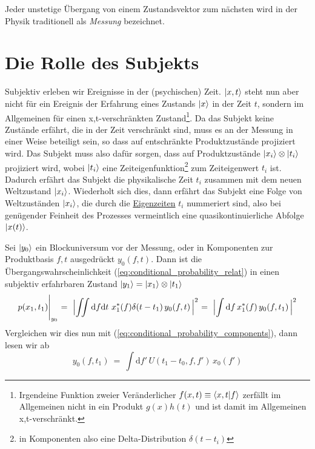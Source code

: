 \documentclass[12pt]{article}
\begin{document}
Jeder unstetige Übergang von einem Zustandsvektor zum nächsten wird in der Physik traditionell als \emph{Messung} bezeichnet. 

\section{Die Rolle des Subjekts}

Subjektiv erleben wir Ereignisse in der (psychischen) Zeit. $\ket{x,t}$ steht nun aber nicht für ein Ereignis der Erfahrung eines Zustands $\ket{x}$ in der Zeit $t$, sondern im Allgemeinen für einen x,t-verschränkten Zustand\footnote{Irgendeine Funktion zweier Veränderlicher $f(x,t)\equiv\bra{x,t}\ket{f}$ zerfällt im Allgemeinen nicht in ein Produkt $g(x)h(t)$ und ist damit im Allgemeinen x,t-verschränkt.}. Da das Subjekt keine Zustände erfährt, die in der Zeit verschränkt sind, muss es an der Messung in einer Weise beteiligt sein, so dass auf entschränkte Produktzustände projiziert wird. Das Subjekt muss also dafür sorgen, dass auf Produktzustände $\ket{x_i}\otimes\ket{t_i}$ projiziert wird, wobei $\ket{t_i}$ eine Zeiteigenfunktion\footnote{in Komponenten also eine Delta-Distribution $\delta(t-t_i)$} zum Zeiteigenwert $t_i$ ist. Dadurch erfährt das Subjekt die physikalische Zeit $t_i$ zusammen mit dem neuen Weltzustand $\ket{x_i}$. Wiederholt sich dies, dann erfährt das Subjekt eine Folge von Weltzuständen $\ket{x_i}$, die durch die \href{https://de.wikipedia.org/wiki/Zeitdilatation}{Eigenzeiten} $t_i$ nummeriert sind, also bei genügender Feinheit des Prozesses vermeintlich eine quasikontinuierliche Abfolge $\ket{x(t)}$.

Sei $\ket{y_0}$ ein Blockuniversum vor der Messung, oder in Komponenten zur Produktbasis $f,t$ ausgedrückt $y_0(f,t)$. Dann ist die Übergangswahrscheinlichkeit (\ref{eq:conditional_probability_relat}) in einen subjektiv erfahrbaren Zustand $\ket{y_1} = \ket{x_1}\otimes\ket{t_1}$
\begin{equation} 
\label{eq:conditional_probability_subject}
p(x_1,t_1)\Biggl|_{y_0}\ =\ \Bigl| \iint \mathrm{d}f\mathrm{d}t\  x_1^*(f)\delta(t-t_1)\, y_0(f,t)\, \Bigl|^2
\ =\ \Bigl| \int \mathrm{d}f\, x_1^*(f)\, y_0(f,t_1)\, \Bigl|^2
\end{equation}
Vergleichen wir dies nun mit (\ref{eq:conditional_probability_components}), dann lesen wir ab
\begin{equation} 
y_0(f,t_1)\ =\ \int \mathrm{d}f'\, U(t_1-t_0,f,f')\, x_0(f')
\end{equation}
\end{document}
